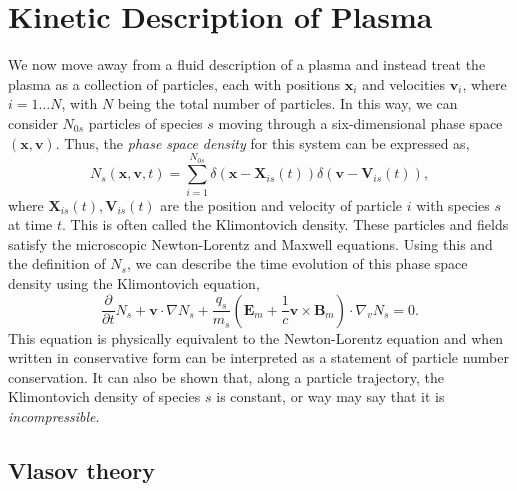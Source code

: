 \section{Kinetic Description of Plasma}
We now move away from a fluid description of a plasma and instead treat the plasma as a collection of particles, each with positions $\mathbf{x}_i$ and velocities $\mathbf{v}_i$, where $i=1\ldots N$, with $N$ being the total number of particles. In this way, we can consider $N_{0s}$ particles of species $s$ moving through a six-dimensional phase space $(\mathbf{x},\mathbf{v})$. Thus, the \textit{phase space density} for this system can be expressed as,
\begin{equation}
	N_s(\mathbf{x},\mathbf{v},t) = \sum_{i=1}^{N_{0s}}\delta(\mathbf{x}-\mathbf{X}_{is}(t))\delta(\mathbf{v} - \mathbf{V}_{is}(t)),
\end{equation}
where $\mathbf{X}_{is}(t),\mathbf{V}_{is}(t)$ are the position and velocity of particle $i$ with species $s$ at time $t$. This is often called the Klimontovich density. These particles and fields satisfy the microscopic Newton-Lorentz and Maxwell equations. Using this and the definition of $N_s$, we can describe the time evolution of this phase space density using the Klimontovich equation,
\begin{equation}
	\frac{\partial}{\partial t}N_s + \mathbf{v}\cdot\nabla N_s + \frac{q_s}{m_s}\left(\mathbf{E}_m + \frac{1}{c}\mathbf{v}\times\mathbf{B}_m\right)\cdot\nabla_vN_s = 0.
\end{equation}
This equation is physically equivalent to the Newton-Lorentz equation and when written in conservative form can be interpreted as a statement of particle number conservation. It can also be shown that, along a particle trajectory, the Klimontovich density of species $s$ is constant, or way may say that it is \textit{incompressible}.

	\subsection{Vlasov theory}


